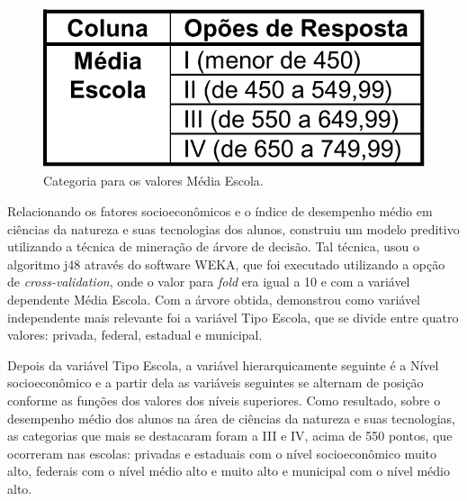 \begin{figure}[!htp]
	\begin{center}
    \caption{\label{fig:waveform_fig} Categoria para os valores Média Escola.}
	\includegraphics[scale=0.50]{Figuras/Tabela_ENEM_2.png}
	\end{center}
\end{figure}

\par
Relacionando os fatores socioeconômicos e o índice de desempenho médio em ciências da natureza e suas tecnologias dos alunos,  construiu um modelo preditivo utilizando a técnica de mineração de árvore de decisão. Tal técnica, usou o algoritmo j48 através do software WEKA, que foi executado utilizando a opção de \textit{cross-validation}, onde o valor para \textit{fold} era igual a 10 e com a variável dependente Média Escola. Com a árvore obtida, demonstrou como variável independente mais relevante foi a variável Tipo Escola, que se divide entre quatro valores: privada, federal, estadual e municipal.


\par
Depois da variável Tipo Escola, a variável hierarquicamente seguinte é a Nível socioeconômico e a partir dela as variáveis seguintes se alternam de posição conforme as funções dos valores dos níveis superiores. Como resultado, sobre o desempenho médio dos alunos na área de ciências da natureza e suas tecnologias, as categorias que mais se destacaram foram a III e IV, acima de 550 pontos, que ocorreram nas escolas: privadas e estaduais com o nível socioeconômico muito alto, federais com o nível médio alto e muito alto e municipal com o nível médio alto.


